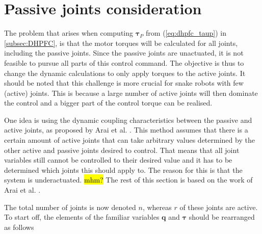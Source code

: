 \section{Passive joints consideration}\label{subsec:passive-joints}

The problem that arises when computing $\boldsymbol{\tau}_P$ from (\ref{eq:dhpfc_taup}) in \ref{subsec:DHPFC}, is that the motor torques will be calculated for all joints, including the passive joints. Since the passive joints are unactuated, it is not feasible to pursue all parts of this control command. The objective is thus to change the dynamic calculations to only apply torques to the active joints. It should be noted that this challenge is more crucial for snake robots with few (active) joints. This is because a large number of active joints will then dominate the control and a bigger part of the control torque can be realised.

One idea is using the dynamic coupling characteristics between the passive and active joints, as proposed by Arai et al. \cite{arai1991position}. This method assumes that there is a certain amount of active joints that can take arbitrary values determined by the other active and passive joints desired to control. That means that all joint variables still cannot be controlled to their desired value and it has to be determined which joints this should apply to. The reason for this is that the system is underactuated. \hl{mhm?} The rest of this section is based on the work of Arai et al. \cite{arai1991position}.

The total number of joints is now denoted $n$, whereas $r$ of these joints are active. To start off, the elements of the familiar variables $\mathbf{q}$ and $\boldsymbol{\tau}$ should be rearranged as follows

